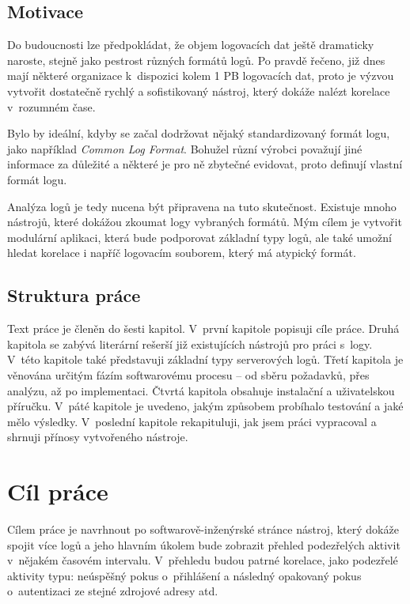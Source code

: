 \documentclass[thesis=B,czech]{FITthesis}[2012/06/26]
\begin{document}
\begin{introduction}
\section{Motivace}
	Do budoucnosti lze předpokládat, že objem logovacích dat ještě dramaticky naroste, stejně jako pestrost různých formátů logů. Po pravdě řečeno, již dnes mají některé organizace k~dispozici kolem 1 PB logovacích dat, proto je výzvou vytvořit dostatečně rychlý a sofistikovaný nástroj, který dokáže nalézt korelace v~rozumném čase. \cite{logManagement}
	
	Bylo by ideální, kdyby se začal dodržovat nějaký standardizovaný formát logu, jako například \textit{Common Log Format}. \cite{commonLogfileFormat} Bohužel různí výrobci považují jiné informace za důležité a některé je pro ně zbytečné evidovat, proto definují vlastní formát logu.
	
	Analýza logů je tedy nucena být připravena na tuto skutečnost. Existuje mnoho nástrojů, které dokážou zkoumat logy vybraných formátů. Mým cílem je vytvořit modulární aplikaci, která bude podporovat základní typy logů, ale také umožní hledat korelace i napříč logovacím souborem, který má atypický formát.
	
\section{Struktura práce}
Text práce je členěn do šesti kapitol. V~první kapitole popisuji cíle práce. Druhá kapitola se zabývá literární rešerší již existujících nástrojů pro práci s~logy. V~této kapitole také představuji základní typy serverových logů. Třetí kapitola je věnována určitým fázím softwarovému procesu -- od sběru požadavků, přes analýzu, až po implementaci. Čtvrtá kapitola obsahuje instalační a uživatelskou příručku. V~páté kapitole je uvedeno, jakým způsobem probíhalo testování a jaké mělo výsledky. V~poslední kapitole rekapituluji, jak jsem práci vypracoval a shrnuji přínosy vytvořeného nástroje.
	
\end{introduction}
		
\chapter{Cíl práce} 
Cílem práce je navrhnout po softwarově-inženýrské stránce nástroj, který dokáže spojit více logů a jeho hlavním úkolem bude zobrazit přehled podezřelých aktivit v~nějakém časovém intervalu. V~přehledu budou patrné korelace, jako podezřelé aktivity typu: neúspěšný pokus o~přihlášení a následný opakovaný pokus o~autentizaci ze stejné zdrojové adresy atd. 
\end{document}
